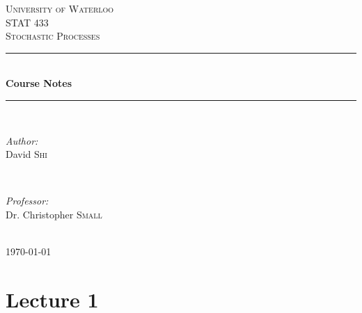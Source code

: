 \documentclass[english,12pt]{article}
\theoremstyle{plain}
\theoremstyle{definition}
\theoremstyle{definition} %
\begin{document}
\begin{titlepage}

\newcommand{\HRule}{\rule{\linewidth}{0.5mm}} %

\center %

\textsc{\LARGE University of Waterloo}\\[1.5cm] %
\textsc{\Large STAT 433}\\[0.5cm] %
\textsc{\large Stochastic Processes}\\[0.5cm] %

\HRule \\[0.4cm]
{ \huge \bfseries Course Notes}\\[0.4cm] %
\HRule \\[1.5cm]

\begin{minipage}{0.4\textwidth}
\begin{flushleft} \large
\emph{Author:}\\
David \textsc{Shi} %
\end{flushleft}
\end{minipage}
~
\begin{minipage}{0.4\textwidth}
\begin{flushright} \large
\emph{Professor:} \\
Dr. Christopher \textsc{Small} %
\end{flushright}
\end{minipage}\\[4cm]

{\large \today}\\[3cm] %


\vfill %

\end{titlepage}

\tableofcontents %

\newpage


\section*{Lecture 1}
\end{document}
